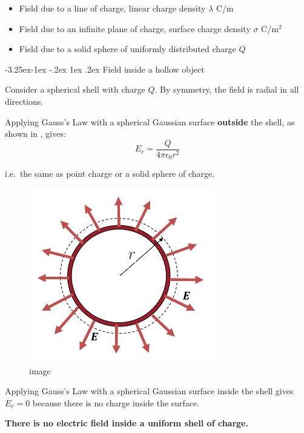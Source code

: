 \documentclass[
]{book}
\makeatletter
\renewcommand\subsection{%
\@startsection{subsection}{2}{\z@}%
              {-3.25ex\@plus -1ex \@minus -.2ex}%
              {1ex \@plus .2ex}%
              {\sffamily\bfseries}}
\numberwithin{equation}{section}
\makeatother
\begin{document}
\begin{itemize}
\item
  Field due to a line of charge, linear charge density \(\lambda\) C/m
\item
  Field due to an infinite plane of charge, surface charge density
  \(\sigma\) C/m\(^2\)
\item
  Field due to a solid sphere of uniformly distributed charge \(Q\)
\end{itemize}

\hypertarget{field-inside-a-hollow-object}{%
\subsection{Field inside a hollow object}\label{field-inside-a-hollow-object}}

Consider a spherical shell with charge \(Q\). By symmetry, the field is
radial in all directions.

Applying Gauss's Law with a spherical Gaussian surface \textbf{outside} the
shell, as shown in , gives:
\begin{equation}
\label{eq:fieldShell}
E_r = \frac{Q}{4\pi\epsilon_0 r^2} 
\end{equation}

i.e.~the same as point charge or a solid sphere of charge.

\begin{figure}
\centering
\includegraphics[width=80mm,height=\textheight]{Figures/GaussOutsideShell.png}
\caption{image}
\end{figure}

Applying Gauss's Law with a spherical Gaussian surface inside the shell
gives \(E_r = 0\) because there is no charge inside the surface.

\textbf{There is no electric field inside a uniform shell of charge.}
\end{document}

